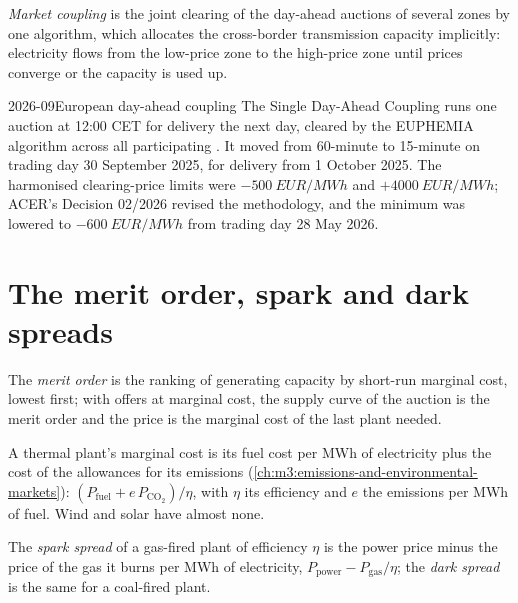 \begin{definition}\label{def:m3:power-markets-design:coupling}
\emph{Market coupling} is the joint clearing of the day-ahead
auctions of several zones by one algorithm, which allocates the cross-border
transmission capacity implicitly: electricity flows from the low-price zone to the
high-price zone until prices converge or the capacity is used up.
\end{definition}

\begin{dated}{2026-09}{European day-ahead coupling}\label{dat:m3:power-markets-design:sdac}
The Single Day-Ahead Coupling runs one auction at 12:00 CET for delivery the next day,
cleared by the EUPHEMIA algorithm across all participating . It moved from
60-minute to 15-minute  on trading day 30 September 2025, for delivery
from 1 October 2025. The harmonised clearing-price limits were $-\qty{500}{EUR/MWh}$ and
$+\qty{4000}{EUR/MWh}$; ACER's Decision 02/2026 revised the methodology, and the minimum
was lowered to $-\qty{600}{EUR/MWh}$ from trading day 28 May 2026.
\end{dated}

\section{The merit order, spark and dark spreads}

\begin{definition}\label{def:m3:power-markets-design:merit}
The \emph{merit order} is the ranking of generating capacity by
short-run marginal cost, lowest first; with offers at marginal cost, the supply curve of
the auction is the merit order and the price is the marginal cost of the last plant
needed.
\end{definition}

A thermal plant's marginal cost is its fuel cost per MWh of electricity plus the cost of
the allowances for its emissions (\cref{ch:m3:emissions-and-environmental-markets}):
$(P_{\mathrm{fuel}} + e\,P_{\mathrm{CO_2}})/\eta$, with $\eta$ its efficiency and $e$ the
emissions per MWh of fuel. Wind and solar have almost none.

\begin{definition}\label{def:m3:power-markets-design:spark}
The \emph{spark spread} of a gas-fired plant of efficiency $\eta$ is
the power price minus the price of the gas it burns per MWh of electricity,
$P_{\mathrm{power}} - P_{\mathrm{gas}}/\eta$; the \emph{dark spread} is
the same for a coal-fired plant.
\end{definition}

